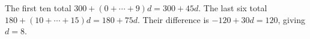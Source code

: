 The first ten total $ 300+(0+\cdots+9)d=300+45d $. The last six total $ 180+(10+\cdots+15)d=180+75d $. Their difference is $-120+30d=120 $, giving $\boxed{d=8}$.
